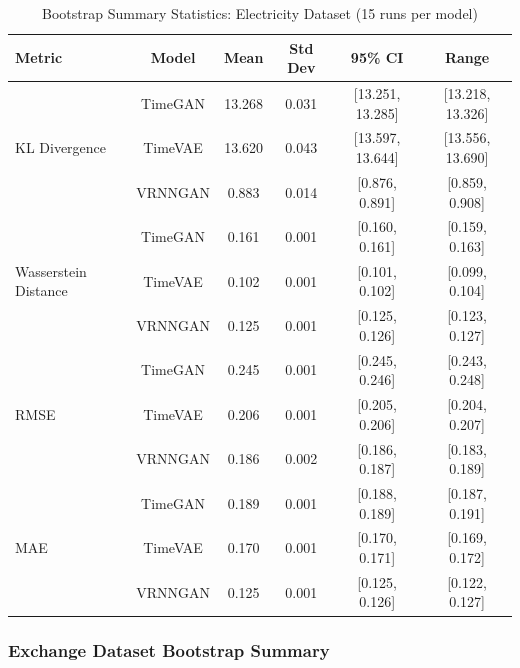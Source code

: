 \documentclass{article}
\begin{document}
\begin{table}[H]
\centering
\caption{Bootstrap Summary Statistics: Electricity Dataset (15 runs per model)}
\label{tab:bootstrap_electricity}
\small
\begin{tabular}{lccccc}
\toprule
\textbf{Metric} & \textbf{Model} & \textbf{Mean} & \textbf{Std Dev} & \textbf{95\% CI} & \textbf{Range} \\
\midrule
\multirow{3}{*}{KL Divergence} 
    & TimeGAN   & 13.268 & 0.031 & [13.251, 13.285] & [13.218, 13.326] \\
    & TimeVAE   & 13.620 & 0.043 & [13.597, 13.644] & [13.556, 13.690] \\
    & VRNNGAN   & 0.883  & 0.014 & [0.876, 0.891]   & [0.859, 0.908] \\
\midrule
\multirow{3}{*}{Wasserstein Distance} 
    & TimeGAN   & 0.161 & 0.001 & [0.160, 0.161] & [0.159, 0.163] \\
    & TimeVAE   & 0.102 & 0.001 & [0.101, 0.102] & [0.099, 0.104] \\
    & VRNNGAN   & 0.125 & 0.001 & [0.125, 0.126] & [0.123, 0.127] \\
\midrule
\multirow{3}{*}{RMSE} 
    & TimeGAN   & 0.245 & 0.001 & [0.245, 0.246] & [0.243, 0.248] \\
    & TimeVAE   & 0.206 & 0.001 & [0.205, 0.206] & [0.204, 0.207] \\
    & VRNNGAN   & 0.186 & 0.002 & [0.186, 0.187] & [0.183, 0.189] \\
\midrule
\multirow{3}{*}{MAE} 
& TimeGAN   & 0.189 & 0.001 & [0.188, 0.189] & [0.187, 0.191] \\
& TimeVAE   & 0.170 & 0.001 & [0.170, 0.171] & [0.169, 0.172] \\
& VRNNGAN   & 0.125 & 0.001 & [0.125, 0.126] & [0.122, 0.127] \\
\bottomrule
\end{tabular}
\end{table}

\subsubsection{Exchange Dataset Bootstrap Summary}
\end{document}
